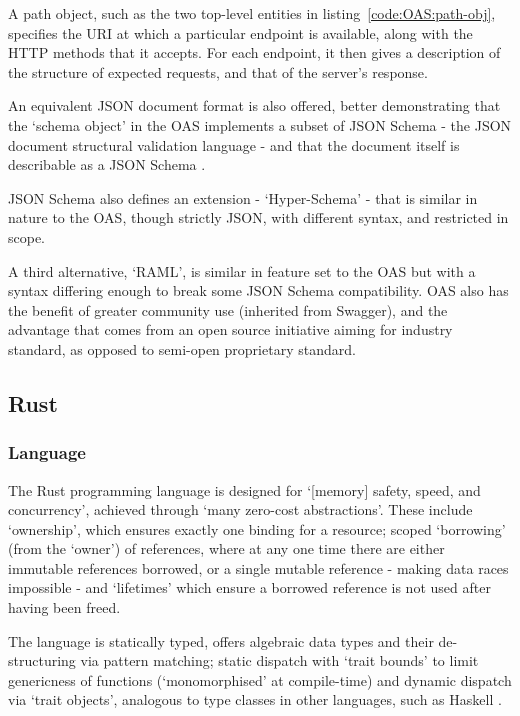A path object, such as the two top-level entities in listing~\ref{code:OAS:path-obj}, specifies the URI at which a particular endpoint is available, along with the HTTP methods that it accepts. For each endpoint, it then gives a description of the structure of expected requests, and that of the server's response.

An equivalent JSON document format is also offered, better demonstrating that the `schema object' in the OAS implements a subset of JSON Schema \cite{oas_v3} - the JSON document structural validation language \cite{json_schema} - and that the document itself is describable as a JSON Schema \cite{oas_json_schema}.

JSON Schema also defines an extension - `Hyper-Schema' - that is similar in nature to the OAS, though strictly JSON, with different syntax, and restricted in scope. \cite{leach_elegant_apis_2014}

A third alternative, `RAML', is similar in feature set to the OAS but with a syntax differing enough to break some JSON Schema compatibility. \cite{raml_v1} OAS also has the benefit of greater community use (inherited from Swagger), and the advantage that comes from an open source initiative aiming for industry standard, as opposed to semi-open proprietary standard.

\subsection{Rust}\label{bg:rust}
\subsubsection{Language}\label{bg:rust:lang}
The Rust programming language is designed for `[memory] safety, speed, and concurrency', achieved through `many zero-cost abstractions'. These include `ownership', which ensures exactly one binding for a resource; scoped `borrowing' (from the `owner') of references, where at any one time there are either immutable references borrowed, or a single mutable reference - making data races impossible - and `lifetimes' which ensure a borrowed reference is not used after having been freed. \cite{rust_book}

The language is statically typed, offers algebraic data types and their de-structuring via pattern matching; \cite{rust_match_mut_move} static dispatch with `trait bounds' to limit genericness of functions (`monomorphised' at compile-time) \cite{rust_book} and dynamic dispatch via `trait objects', analogous to type classes in other languages, such as Haskell \cite{rust_functional}. \cite{rust_type_system}

